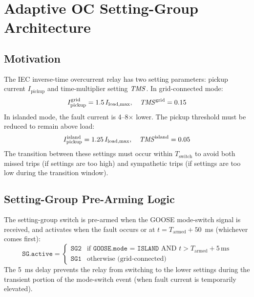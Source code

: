 \section{Adaptive OC Setting-Group Architecture}
\label{sec:ch5_adaptiveoc}

\subsection{Motivation}

The IEC inverse-time overcurrent relay has two setting parameters:
pickup current $I_\mathrm{pickup}$ and time-multiplier setting $\mathit{TMS}$.
In grid-connected mode:
\begin{equation}
  I_\mathrm{pickup}^\mathrm{grid} = 1.5\,I_\mathrm{load,max}, \quad
  \mathit{TMS}^\mathrm{grid} = 0.15
  \label{eq:ch6_sg_settings}
\end{equation}
In islanded mode, the fault current is 4--8$\times$ lower. The pickup
threshold must be reduced to remain above load:
\begin{equation}
  I_\mathrm{pickup}^\mathrm{island} = 1.25\,I_\mathrm{load,max}, \quad
  \mathit{TMS}^\mathrm{island} = 0.05
  \label{eq:ch6_island_settings}
\end{equation}
The transition between these settings must occur within $T_\mathrm{switch}$
to avoid both missed trips (if settings are too high) and sympathetic
trips (if settings are too low during the transition window).

\subsection{Setting-Group Pre-Arming Logic}

The setting-group switch is pre-armed when the GOOSE mode-switch signal
is received, and activates when the fault occurs or at
$t = T_\mathrm{armed} + 50$~ms (whichever comes first):
\begin{equation}
  \texttt{SG.active} = \begin{cases}
    \texttt{SG2} & \text{if } \texttt{GOOSE.mode = ISLAND} \text{ AND } t > T_\mathrm{armed} + 5\,\mathrm{ms} \\
    \texttt{SG1} & \text{otherwise (grid-connected)}
  \end{cases}
  \label{eq:ch6_sg_logic}
\end{equation}
The 5~ms delay prevents the relay from switching to the lower settings
during the transient portion of the mode-switch event (when fault current
is temporarily elevated).

